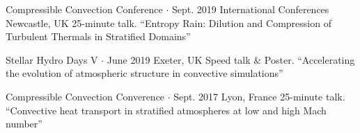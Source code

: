 

\begin{cventries}

  \cventry
    {Compressible Convection Conference $\cdot$ Sept. 2019} %
    {International Conferences} %
    {} %
    {Newcastle, UK} %
    {25-minute talk. ``Entropy Rain: Dilution and Compression of Turbulent Thermals in Stratified Domains''}

  \cventry
    {Stellar Hydro Days V $\cdot$ June 2019} 
    {} 
    {} 
    {Exeter, UK} %
    {Speed talk \& Poster. ``Accelerating the evolution of atmospheric structure in convective simulations''} %

  \cventry
    {Compressible Convection Converence $\cdot$ Sept. 2017}
    {}
    {}
    {Lyon, France}
    {25-minute talk. ``Convective heat transport in stratified atmospheres at low and high Mach number''}

\end{cventries}


